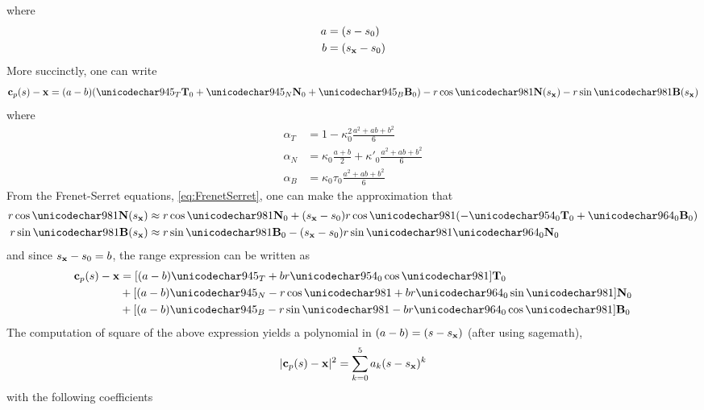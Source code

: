 where
\begin{align}
 a &= (s-s_0)\\
 b &= (s_{\mathbf{x}} - s_0)
\end{align}
More succinctly, one can write
\begin{equation}
 \satp(\parm)-\vct\target = (a-b)(\alpha_T\vct{T}_0 + \alpha_N\vct{N}_0 + \alpha_B\vct{B}_0)- \targetrange\cos\targetdepression\vct{N}(\targetxparm) - \targetrange\sin\targetdepression\vct{B}(\targetxparm)
\end{equation}
where
\begin{align}
 \alpha_T &= 1 - \kappa^2_0\frac{a^2+ab+b^2}{6}\\
 \alpha_N &= \kappa_0\frac{a+b}{2} + {\kappa'}_0\frac{a^2+ab+b^2}{6}\\
 \alpha_B &= \kappa_0\tau_0\frac{a^2+ab+b^2}{6}
\end{align}
From the Frenet-Serret equations, \eqref{eq:FrenetSerret}, one can make the approximation that
\begin{align}
 \targetrange\cos\targetdepression\vct{N}(\targetxparm)&\approx\targetrange\cos\targetdepression\vct{N}_0 + (\targetxparm-\parm_0)\targetrange\cos\targetdepression(-\kappa_0\vct{T}_0 + \tau_0\vct{B}_0)\\
 \targetrange\sin\targetdepression\vct{B}(\targetxparm)&\approx\targetrange\sin\targetdepression\vct{B}_0 - (\targetxparm-\parm_0)\targetrange\sin\targetdepression\tau_0\vct{N}_0
\end{align}
and since $s_{\mathbf{x}}-s_0 = b$, the range expression can be written as
\begin{equation}
\begin{split}
 \satp(\parm)-\vct\target &= [(a-b)\alpha_T + b\targetrange\kappa_0\cos\targetdepression]\vct{T}_0\\
 &+ [(a-b)\alpha_N - \targetrange\cos\targetdepression + b\targetrange\tau_0\sin\targetdepression]\vct{N}_0\\
 &+ [(a-b)\alpha_B- \targetrange\sin\targetdepression - b\targetrange\tau_0\cos\targetdepression]\vct{B}_0
 \end{split}
\end{equation}
The computation of square of the above expression yields a polynomial in $(a-b) = (s-s_{\mathbf{x}})$ (after using sagemath),
\begin{equation}
 \lvert\mathbf{c}_p(s)-\mathbf{\mathbf{x}}\rvert^2 = \sum_{k=0}^5a_k(s-s_{\mathbf{x}})^k
\end{equation}
with the following coefficients
